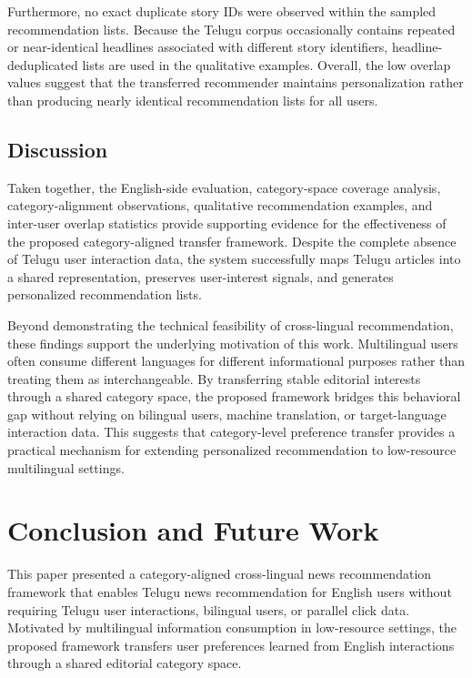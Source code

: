 \documentclass[conference]{IEEEtran}
\begin{document}
Furthermore, no exact duplicate story IDs were observed within the sampled recommendation lists. Because the Telugu corpus occasionally contains repeated or near-identical headlines associated with different story identifiers, headline-deduplicated lists are used in the qualitative examples. Overall, the low overlap values suggest that the transferred recommender maintains personalization rather than producing nearly identical recommendation lists for all users.

\subsection{Discussion}

Taken together, the English-side evaluation, category-space coverage analysis, category-alignment observations, qualitative recommendation examples, and inter-user overlap statistics provide supporting evidence for the effectiveness of the proposed category-aligned transfer framework. Despite the complete absence of Telugu user interaction data, the system successfully maps Telugu articles into a shared representation, preserves user-interest signals, and generates personalized recommendation lists.

Beyond demonstrating the technical feasibility of cross-lingual recommendation, these findings support the underlying motivation of this work. Multilingual users often consume different languages for different informational purposes rather than treating them as interchangeable. By transferring stable editorial interests through a shared category space, the proposed framework bridges this behavioral gap without relying on bilingual users, machine translation, or target-language interaction data. This suggests that category-level preference transfer provides a practical mechanism for extending personalized recommendation to low-resource multilingual settings.


\section{Conclusion and Future Work}

This paper presented a category-aligned cross-lingual news recommendation framework that enables Telugu news recommendation for English users without requiring Telugu user interactions, bilingual users, or parallel click data. Motivated by multilingual information consumption in low-resource settings, the proposed framework transfers user preferences learned from English interactions through a shared editorial category space.
\end{document}
